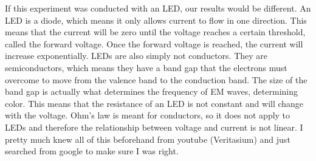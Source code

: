 \documentclass{report}
\begin{document}
If this experiment was conducted with an LED, our results would be different. An LED is a diode, which means it only allows current to flow in one direction. This means that the current will be zero until the voltage reaches a certain threshold, called the forward voltage. Once the forward voltage is reached, the current will increase exponentially. LEDs are also simply not conductors. They are semiconductors, which means they have a band gap that the electrons must overcome to move from the valence band to the conduction band. The size of the band gap is actually what determines the frequency of EM waves, determining color. This means that the resistance of an LED is not constant and will change with the voltage. Ohm's law is meant for conductors, so it does not apply to LEDs and therefore the relationship between voltage and current is not linear. I pretty much knew all of this beforehand from youtube (Veritasium) and just searched from google to make sure I was right. 
\end{document}
